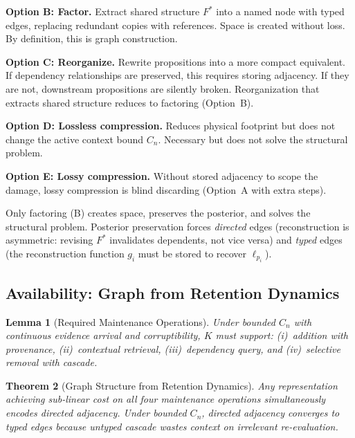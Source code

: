 \documentclass[11pt]{article}
\newtheorem{theorem}{Theorem}
\newtheorem{lemma}[theorem]{Lemma}
\theoremstyle{definition}
\theoremstyle{remark}
\begin{document}
\textbf{Option B: Factor.} Extract shared structure $F^*$ into a named
node with typed edges, replacing redundant copies with references.
Space is created without loss. By definition, this is graph
construction.

\textbf{Option C: Reorganize.} Rewrite propositions into a more compact
equivalent. If dependency relationships are preserved, this requires
storing adjacency. If they are not, downstream propositions are silently
broken. Reorganization that extracts shared structure reduces to
factoring (Option~B).

\textbf{Option D: Lossless compression.} Reduces physical footprint but
does not change the active context bound $C_n$. Necessary but does not
solve the structural problem.

\textbf{Option E: Lossy compression.} Without stored adjacency to scope
the damage, lossy compression is blind discarding (Option~A with extra
steps).

Only factoring (B) creates space, preserves the posterior, and solves
the structural problem. Posterior preservation forces \emph{directed}
edges (reconstruction is asymmetric: revising $F^*$ invalidates
dependents, not vice versa) and \emph{typed} edges (the reconstruction
function $g_i$ must be stored to recover $\ell_{p_i}$).

\subsection{Availability: Graph from Retention Dynamics}

\begin{lemma}[Required Maintenance Operations]
\label{lem:ops}
Under bounded $C_n$ with continuous evidence arrival and
corruptibility, $K$ must support: (i)~addition with provenance,
(ii)~contextual retrieval, (iii)~dependency query, and
(iv)~selective removal with cascade.
\end{lemma}

\begin{theorem}[Graph Structure from Retention Dynamics]
\label{thm:graph-dynamics}
Any representation achieving sub-linear cost on all four maintenance
operations simultaneously encodes directed adjacency. Under bounded
$C_n$, directed adjacency converges to typed edges because untyped
cascade wastes context on irrelevant re-evaluation.
\end{theorem}
\end{document}
